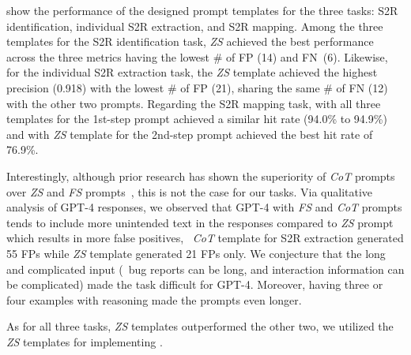  show the performance of the designed prompt templates for the three tasks: S2R identification, individual S2R extraction, and S2R mapping. 
Among the three templates for the S2R identification task, \textit{ZS} achieved the best performance across the three metrics having the lowest \# of FP (14) and FN~(6). Likewise, for the individual S2R extraction task, the \textit{ZS} template achieved the highest precision (0.918) with the lowest \# of FP (21), sharing the same \# of FN (12) with the other two prompts. Regarding the S2R mapping task, \tool with all three templates for the 1st-step prompt achieved a similar hit rate (94.0\% to 94.9\%) and with \textit{ZS} template for the 2nd-step prompt achieved the best hit rate of 76.9\%. 

Interestingly, although prior research has shown the superiority of \textit{CoT} prompts over \textit{ZS} and \textit{FS} prompts~\cite{hou2023large,Feng2024}, this is not the case for our tasks. Via qualitative analysis of GPT-4 responses, we observed that GPT-4 with \textit{FS} and \textit{CoT} prompts tends to include more unintended text in the responses compared to \textit{ZS} prompt which results in more false positives, \eg\ \textit{CoT} template for S2R extraction generated 55 FPs while \textit{ZS} template generated 21 FPs only. We conjecture that the long and complicated input (\eg\ bug reports can be long, and interaction information can be complicated) made the task difficult for GPT-4. Moreover, having three or four examples with reasoning made the prompts even longer.

As for all three tasks, \textit{ZS} templates outperformed the other two, we utilized the \textit{ZS} templates for implementing \tool.
